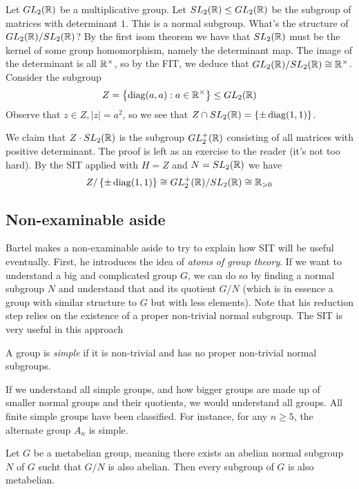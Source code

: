 \begin{example}
  Let $GL_2(\mathbb R)$ be a multiplicative group. Let $SL_2(\mathbb R)\leq GL_2(\mathbb R)$ be the subgroup
  of matrices with determinant $1$. This is a normal subgroup. What's the structure of
  $GL_2(\mathbb R)/SL_2(\mathbb R)$? By the first isom theorem we have that $SL_2(\mathbb R)$ must be the
  kernel of some group homomorphism, namely the determinant map. The image of the
  determinant is all $\mathbb R^{\times}$, so by the FIT, we deduce that
  $GL_2(\mathbb R)/SL_2(\mathbb R)\cong \mathbb R^{\times}$. Consider the subgroup
  \[Z= \left\{ \operatorname*{diag} (a,a) : a\in \mathbb R^{\times} \right\} \leq GL_{2}(\mathbb R)\]
  Observe that $z\in Z, |z|=a^2$, so we see that $Z\cap SL_{2}(\mathbb R) = \left\{ \pm
  \operatorname*{diag}(1,1) \right\}$. 

  We claim that $Z\cdot SL_2(\mathbb R)$ is the subgroup $GL_2^+(\mathbb R)$
  consisting of all matrices with positive determinant. The proof is left as an exercise
  to the reader (it's not too hard). By the SIT applied with $H=Z$ and $N=SL_2(\mathbb R)$ we
  have
  \[ Z/\left\{ \pm \operatorname*{diag}(1,1) \right\} \cong GL_2^+(\mathbb R)/ SL_2(\mathbb R) \cong \mathbb R_{>0}\]

\end{example}

\subsection{Non-examinable aside}
Bartel makes a non-examinable aside to try to explain how SIT will be useful eventually.
First, he introduces the idea of \emph{atoms of group theory}. If we want to understand a
big and complicated group $G$, we can do so by finding a normal subgroup $N$ and
understand that and its quotient $G/N$ (which is in essence a group with similar structure
to $G$ but with less elements). Note that his reduction step relies on the existence of a
proper non-trivial normal subgroup. The SIT is very useful in this approach
\begin{definition}
  A group is \emph{simple} if it is non-trivial and has no proper non-trivial normal
  subgroups.
\end{definition}

If we understand all simple groups, and how bigger groups are made up of smaller normal
groups and their quotients, we would understand all groups. All finite simple groups have
been classified. For instance, for any $n\geq 5$, the alternate group $A_n$ is simple.

\begin{theorem}
  Let $G$ be a metabelian group, meaning there exists an abelian normal subgroup $N$ of
  $G$ sucht that $G/N$ is also abelian. Then every subgroup of $G$ is also metabelian.
  \label{<+label+>}
\end{theorem}
